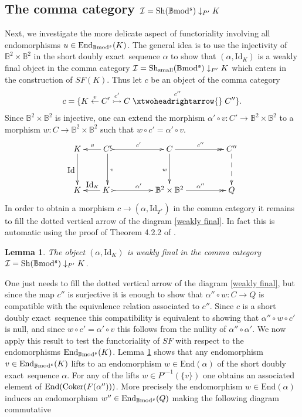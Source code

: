 \documentclass[12pt]{article}
\newtheorem{lem}[thm]{Lemma}
\def\End{{\rm End}}
\def\id{{\rm id}}
\def\coker{{\rm Coker}}
\def\B{{\mathbb B}}
\def\exxx{{doubly exact}~}
\def\cI{{\mathcal I}}
\def\id{{\mbox{Id}}}
\def\End{{\mbox{End}}}
\def\sequ{{\rm Sh}}
\def\b2{{\rm \B mod^{\mathfrak s}}}
\begin{document}
\subsection{The comma category $\cI=\sequ(\b2)\downarrow_{P'} K$}\label{sect comma cat}

Next, we investigate the more delicate aspect of functoriality involving all endomorphisms  $u\in \End_\b2(K)$. The general idea is to use the injectivity of $\B^2\times \B^2$ in the short \exxx sequence $\alpha$ to show that $(\alpha,\id_{K})$ is a weakly final object in the comma category $\cI=\sequ_{\rm small}(\b2)\downarrow_{P'} K$ 
	which enters in the construction of $SF(K)$. Thus let $c$ be an object of the comma category
	$$
	c=\{K\stackrel{v}{\leftarrow} C'\stackrel{c'}{\rightarrowtail}C \stackrel{c''}{\xtwoheadrightarrow{}}C''\}.
	$$ 
Since $\B^2\times \B^2$ is injective, one can extend the morphism $\alpha'\circ v:C'\to \B^2\times \B^2$ to a morphism $w:C\to \B^2\times \B^2$ such that $w\circ c'=\alpha'\circ v$. 
\begin{equation}\label{weakly final}
\xymatrix@C=20pt@R=35pt{
K\ar[d]_\id &  C' \ar[l]_{v}\ar[d]^{v}\ar@{>->}[rr]^{c'} && C\ar[d]_{w} \ar@{->>}[rr]^{c''}&& C''\ar@{-->}[d]
\\
K & \ar[l]_{\id_{K}}K \ \ar@{>->}[rr]^{\alpha'}&& \B^2\times \B^2 \ar@{->>}[rr]^{\alpha''}&& Q}
\end{equation}
In order to obtain a morphism  $c \to (\alpha,\id_{T^*})$ in the comma category it remains to fill the dotted vertical arrow of the diagram \eqref{weakly final}. In fact this is automatic using the proof of Theorem 4.2.2 of \cite{gra1}.
\begin{lem}\label{lem weakly final} The object $(\alpha,\id_{K})$ is  weakly final  in the comma category $\cI=\sequ(\b2)\downarrow_{P'} K$.
\end{lem}
\proof One just needs to fill the dotted vertical arrow of the diagram \eqref{weakly final}, but since the map $c''$ is surjective it is enough to show that $\alpha''\circ w:C\to Q$ is compatible with the equivalence relation associated to $c''$. Since $c$ is a short \exxx sequence this compatibility is equivalent to showing that $\alpha''\circ w\circ c'$ is null, and since $w\circ c'=\alpha'\circ v$ this follows from the nullity of $\alpha''\circ \alpha'$. \endproof 
We now apply this result to test the functoriality of $SF$ with respect to the endomorphisms 
$\End_\b2(K)$. Lemma \ref{lem weakly final} shows that any endomorphism $v\in \End_\b2(K)$ lifts to an endomorphism $w\in \End(\alpha)$ of the short \exxx sequence $\alpha$. For any of the lifts $w\in P'^{-1}(\{v\})$ one obtains an associated element of $\End(\coker(F(\alpha'')))$. More precisely the endomorphism $w \in \End(\alpha)$ induces an endomorphism $w''\in \End_\b2(Q)$ making the following diagram commutative
\end{document}
